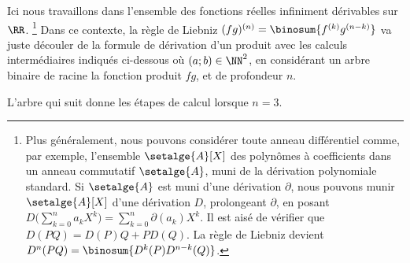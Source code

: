 Ici nous travaillons dans l'ensemble des fonctions réelles infiniment dérivables sur $\RR$.%
\footnote{
	Plus généralement, nous pouvons considérer toute anneau différentiel comme, par exemple, l'ensemble $\setalge{A}[X]$ des polynômes à coefficients dans un anneau commutatif $\setalge{A}$, muni de la dérivation polynomiale standard.
	Si $\setalge{A}$ est muni d'une dérivation $\partial$,
	nous pouvons munir $\setalge{A}[X]$ d'une dérivation $D$, prolongeant $\partial$, en posant
	$D \big( \sum_{k=0}^n a_k X^k \big) = \sum_{k=0}^n \partial(a_k) X^k$.
	Il est aisé de vérifier que $D(PQ) = D(P) Q + P D(Q)$.
	La règle de Liebniz devient $D^n(PQ) = \binosum{D^k(P) D^{n-k}(Q)}$.
}
Dans ce contexte,
la règle de Liebniz $(fg)^{(n)} = \binosum{f^{(k)} g^{(n-k)}}$ va juste découler de la formule de dérivation d'un produit avec les calculs intermédiaires indiqués ci-dessous où $(a;b) \in \NN^2$, en considérant un arbre binaire de racine la fonction produit $f g$, et de profondeur $n$.

%
            {\intertree}{\prodder}


L'arbre qui suit donne les étapes de calcul lorsque $n=3$.

\binotree{\prodder}


